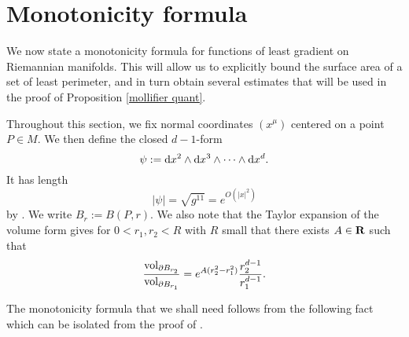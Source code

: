 \section{Monotonicity formula}\label{Monotonicity}
We now state a monotonicity formula for functions of least gradient on Riemannian manifolds.
This will allow us to explicitly bound the surface area of a set of least perimeter, and in turn obtain several estimates that will be used in the proof of Proposition \ref{mollifier quant}.

Throughout this section, we fix normal coordinates $(x^\mu)$ centered on a point $P \in M$.
We then define the closed $d-1$-form
\begin{equation}\label{d1 form}
\psi := \mathop{}\!\mathrm{d} x^2 \wedge \mathop{}\!\mathrm{d} x^3 \wedge \cdots \wedge \mathop{}\!\mathrm{d} x^d.
\end{equation}
It has length
\begin{equation}\label{norm of d1 form}
|\psi| = \sqrt{g^{11}} = e^{O(|x|^2)}
\end{equation}
by \cite[Lemma 3.4]{schoen1994lectures}. We write $B_r := B(P, r)$.
We also note that the Taylor expansion of the volume form \cite{gray1974volume} gives for $0 < r_1, r_2 < R$ with $R$ small that there exists $A \in \mathbf{R}$ such that
\begin{equation}\label{taylor expand the sphere form}
\frac{\mathrm{vol}_{\partial B_{r_2}}}{\mathrm{vol}_{\partial B_{r_1}}} = e^{A(r_2^2 - r_1^2)} \frac{r_2^{d - 1}}{r_1^{d - 1}}.
\end{equation}

The monotonicity formula that we shall need follows from the following fact which can be isolated from the proof of \cite[Lemma 5.8]{Giusti77}.

